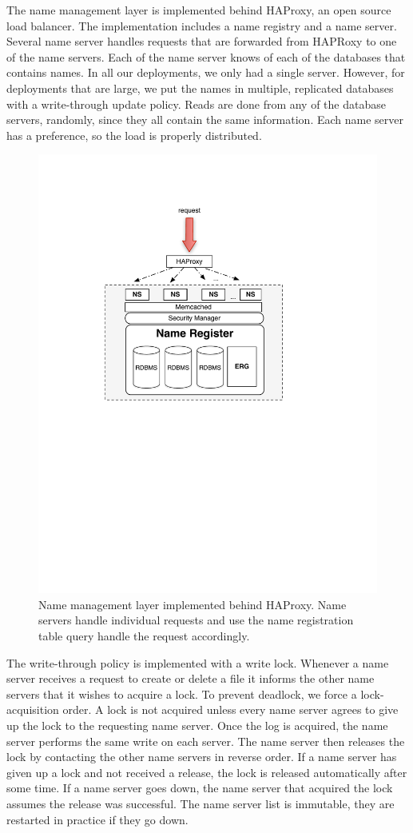 The name management layer is implemented behind HAProxy, an open source load balancer. The implementation includes 
a name registry and a name server.  Several name server handles requests that are forwarded
from HAPRoxy to one of the name servers.  Each of the name server knows of each of the databases that contains names. 
In all our deployments, we only had a single server.  However, for deployments that are large, we put the names in multiple, 
replicated databases with a write-through update policy.  Reads are done from any of the database servers, randomly, since
they all contain the same information.  Each name server has a preference, so the load is properly distributed.

\begin{figure}[h!] %
\centering
\includegraphics[width=.55\columnwidth]{figs/name_reg}
\caption{Name management layer implemented behind HAProxy.  Name servers handle individual requests and use the name registration table
query handle the request accordingly.}
\label{fig:nameserver}
\end{figure}

The write-through policy is implemented with a write lock.  Whenever a name server receives a request to create or delete a file it informs the
other name servers that it wishes to acquire a lock.  To prevent deadlock, we force a lock-acquisition order.  A lock is not acquired unless every
name server agrees to give up the lock to the requesting name server.  Once the log is acquired, the name server performs the same write on each
server.  The name server then releases the lock by contacting the other name servers in reverse order.  If a name server has given up a lock
and not received a release, the lock is released automatically after some time.  If a name server goes down, the name server that acquired the lock
assumes the release was successful.  The name server list is immutable, they are restarted in practice if they go down.

